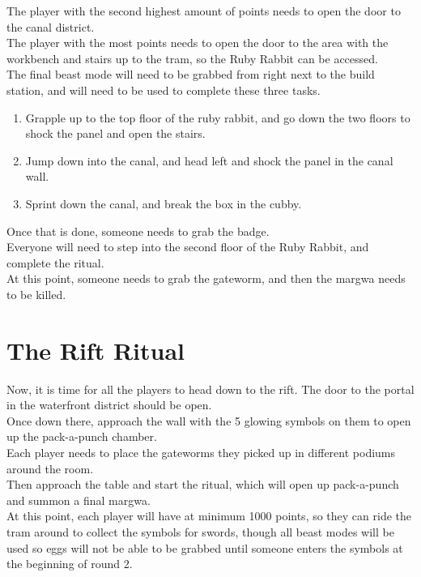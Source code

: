 \documentclass[11pt]{article} %
\begin{document}
	The player with the second highest amount of points needs to open the door to the canal district. \\

	The player with the most points needs to open the door to the area with the workbench and stairs up to the tram, so the Ruby Rabbit can be accessed. \\

	The final beast mode will need to be grabbed from right next to the build station, and will need to be used to complete these three tasks.

	\begin{enumerate}
		\item Grapple up to the top floor of the ruby rabbit, and go down the two floors to shock the panel and open the stairs.
		\item Jump down into the canal, and head left and shock the panel in the canal wall.
		\item Sprint down the canal, and break the box in the cubby.
	\end{enumerate}

	Once that is done, someone needs to grab the badge. \\

	Everyone will need to step into the second floor of the Ruby Rabbit, and complete the ritual. \\

	At this point, someone needs to grab the gateworm, and then the margwa needs to be killed.

\newpage
\section{The Rift Ritual}

	Now, it is time for all the players to head down to the rift. The door to the portal in the waterfront district should be open. \\

	Once down there, approach the wall with the 5 glowing symbols on them to open up the pack-a-punch chamber. \\

	Each player needs to place the gateworms they picked up in different podiums around the room. \\

	Then approach the table and start the ritual, which will open up pack-a-punch and summon a final margwa. \\

	At this point, each player will have at minimum 1000 points, so they can ride the tram around to collect the symbols for swords, though all beast modes will be used so eggs will not be able to be grabbed until someone enters the symbols at the beginning of round 2.
\end{document}
